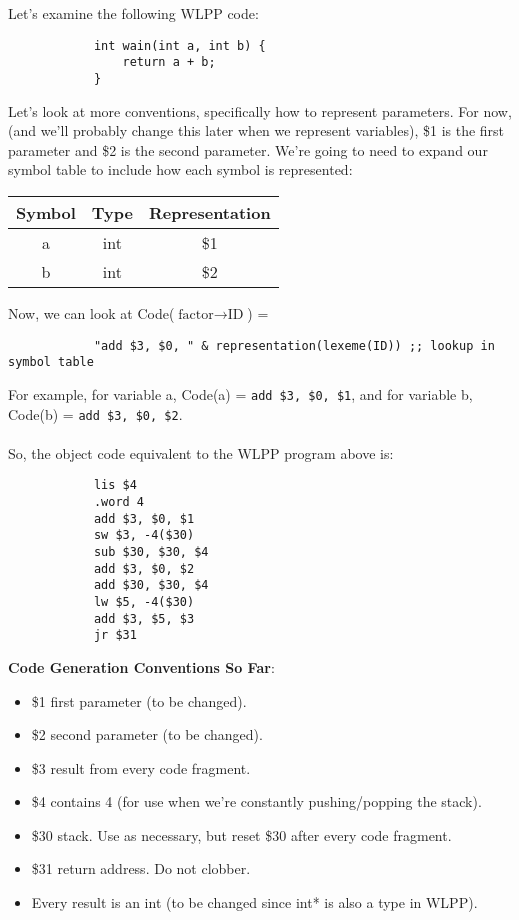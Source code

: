 \documentclass[]{article}
\theoremstyle{definition}
\newcommand{\lecture}[1]{\marginpar{{\footnotesize $\leftarrow$ \underline{#1}}}}
\begin{document}
			Let's examine the following WLPP code:
			\begin{verbatim}
			int wain(int a, int b) {
			    return a + b;
			}
			\end{verbatim}

			Let's look at more conventions, specifically how to represent parameters. For now, (and we'll probably change this later when we represent variables), \$1 is the first parameter and \$2 is the second parameter. We're going to need to expand our symbol table to include how each symbol is represented:
			
			\begin{center}
				\begin{tabular}{|c|c|c|}
					\hline
					Symbol & Type & Representation \\ \hline
					a & int & \$1 \\
					b & int & \$2 \\ \hline
				\end{tabular}
			\end{center}

			Now, we can look at Code($\text{factor} \to \text{ID}$) =
			\begin{verbatim}
			"add $3, $0, " & representation(lexeme(ID)) ;; lookup in symbol table
			\end{verbatim}

			For example, for variable a, Code(a) = \verb+add $3, $0, $1+, and for variable b, Code(b) = \verb+add $3, $0, $2+.
			\\ \\
			So, the object code equivalent to the WLPP program above is:
			\begin{verbatim}
			lis $4
			.word 4
			add $3, $0, $1
			sw $3, -4($30)
			sub $30, $30, $4
			add $3, $0, $2
			add $30, $30, $4
			lw $5, -4($30)
			add $3, $5, $3
			jr $31
			\end{verbatim}

			\textbf{Code Generation Conventions So Far}: \lecture{March 18, 2013}
			\begin{itemize}
				\item \$1 \textendash{} first parameter (to be changed).
				\item \$2 \textendash{} second parameter (to be changed).
				\item \$3 \textendash{} result from every code fragment.
				\item \$4 \textendash{} contains 4 (for use when we're constantly pushing/popping the stack).
				\item \$30 \textendash{} stack. Use as necessary, but reset \$30 after every code fragment.
				\item \$31 \textendash{} return address. Do not clobber.
				\item Every result is an int (to be changed since int* is also a type in WLPP).
			\end{itemize}
\end{document}

